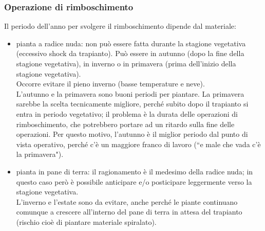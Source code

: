 \subsubsection{Operazione di rimboschimento}
Il periodo dell'anno per svolgere il rimboschimento dipende dal materiale:
\begin{itemize}[nosep]
    \item pianta a radice nuda: non può essere fatta durante la stagione vegetativa (eccessivo shock da trapianto). Può essere in autunno (dopo la fine della stagione vegetativa), in inverno o in primavera (prima dell'inizio della stagione vegetativa).\\
    Occorre evitare il pieno inverno (basse temperature e neve).\\
    L'autunno e la primavera sono buoni periodi per piantare. La primavera sarebbe la scelta tecnicamente migliore, perché subito dopo il trapianto si entra in periodo vegetativo; il problema è la durata delle operazioni di rimboschimento, che potrebbero portare ad un ritardo sulla fine delle operazioni. Per questo motivo, l'autunno è il miglior periodo dal punto di vista operativo, perché c'è un maggiore franco di lavoro (``e male che vada c'è la primavera"). 
    \item pianta in pane di terra: il ragionamento è il medesimo della radice nuda; in questo caso però è possibile anticipare e/o posticipare leggermente verso la stagione vegetativa.\\
    L'inverno e l'estate sono da evitare, anche perché le piante continuano comunque a crescere all'interno del pane di terra in attesa del trapianto (rischio cioè di piantare materiale spiralato). 
\end{itemize}